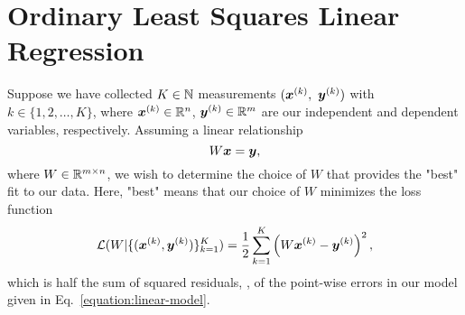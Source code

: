 \section{Ordinary Least Squares Linear Regression}
\label{section:ordinary-least-squares}
%
%
Suppose we have collected $K \in \mathbb{N}$ measurements $(\bm{x}^{(k)},~\bm{y}^{(k)})$ with $k \in \{1, 2, \dots, K\}$,
where $\bm{x}^{(k)} \in \mathbb{R}^n$, $\bm{y}^{(k)} \in \mathbb{R}^m$ are our independent and dependent variables, respectively.
Assuming a linear relationship
%
\begin{equation}
    \label{equation:linear-model}
    W \bm{x} = \bm{y},
\end{equation}
%
where $W \in \mathbb{R}^{m \times n}$, we wish to determine the choice of $W$ that provides the "best" fit to our data.
Here, "best" means that our choice of $W$ minimizes the loss function
%
\begin{equation}
    \mathcal{L}(W | \{(\bm{x}^{(k)}, \bm{y}^{(k)})\}_{k=1}^K) = \frac{1}{2} \sum_{k=1}^K \left( W \bm{x}^{(k)} - \bm{y}^{(k)} \right)^2,
\end{equation}
%
which is half the sum of squared residuals, \ie, of the point-wise errors in our model given in Eq.~\eqref{equation:linear-model}.

